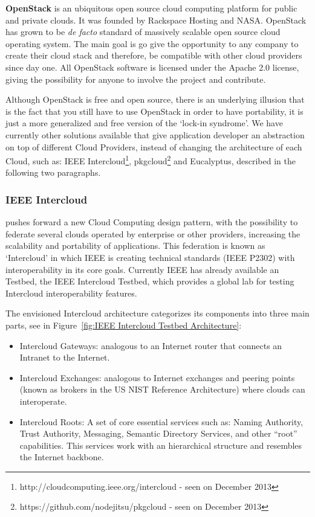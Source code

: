 \textbf{OpenStack} is an ubiquitous open source cloud computing platform for public and private clouds. It was founded by Rackspace Hosting and NASA. OpenStack has grown to be \textit{de facto} standard of massively scalable open source cloud operating system. The main goal is go give the opportunity to any company to create their cloud stack and therefore, be compatible with other cloud providers since day one. All OpenStack software is licensed under the Apache 2.0 license, giving the possibility for anyone to involve the project and contribute. 

Although OpenStack is free and open source, there is an underlying illusion that is the fact that you still have to use OpenStack in order to have portability, it is just a more generalized and free version of the `lock-in syndrome'. We have currently other solutions available that give application developer an abstraction on top of different Cloud Providers, instead of changing the architecture of each Cloud, such as: IEEE Intercloud\footnote{http://cloudcomputing.ieee.org/intercloud - seen on December 2013}, pkgcloud\footnote{https://github.com/nodejitsu/pkgcloud - seen on December 2013} and Eucalyptus\cite{Nurmi2009}, described in the following two paragraphs.


\subsubsection{\textbf{IEEE Intercloud}} %
\label{par:IEEE Intercloud}

pushes forward a new Cloud Computing design pattern, with the possibility to federate several clouds operated by enterprise or other providers, increasing the scalability and portability of applications. This federation is known as `Intercloud' in which IEEE is creating technical standards (IEEE P2302) with interoperability in its core goals. Currently IEEE has already available an Testbed, the IEEE Intercloud Testbed, which provides a global lab for testing Intercloud interoperability features.

The envisioned Intercloud architecture categorizes its components into three main parts, see in Figure~\ref{fig:IEEE Intercloud Testbed Architecture}:

\begin{itemize}
  \item Intercloud Gateways: analogous to an Internet router that connects an Intranet to the Internet.
  \item Intercloud Exchanges: analogous to Internet exchanges and peering points (known as brokers in the US NIST Reference Architecture) where clouds can interoperate.
  \item Intercloud Roots: A set of core essential services such as: Naming Authority, Trust Authority, Messaging, Semantic Directory Services, and other “root” capabilities. This services work with an hierarchical structure and resembles the Internet backbone.
\end{itemize}

